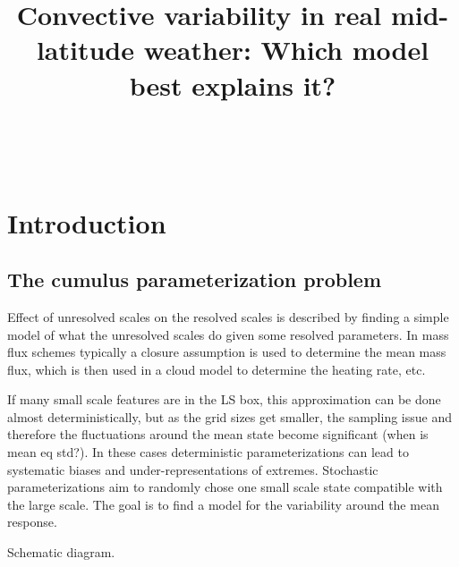 \documentclass[a4paper, 12pt]{article}
\title{Convective variability in real mid-latitude weather: Which model best explains it?}
\begin{document}
\maketitle\

\tableofcontents
	
\section{Introduction}

\subsection{The cumulus parameterization problem}

Effect of unresolved scales on the resolved scales is described by finding a simple model of what the unresolved scales do given some resolved parameters. In mass flux schemes typically a closure assumption is used to determine the mean mass flux, which is then used in a cloud model to determine the heating rate, etc.

If many small scale features are in the LS box, this approximation can be done almost deterministically, but as the grid sizes get smaller, the sampling issue and therefore the fluctuations around the mean state become significant (when is mean eq std?). In these cases deterministic parameterizations can lead to systematic biases and under-representations of extremes. Stochastic parameterizations aim to randomly chose one small scale state compatible with the large scale. The goal is to find a model for the variability around the mean response. 

Schematic diagram.
\end{document}
